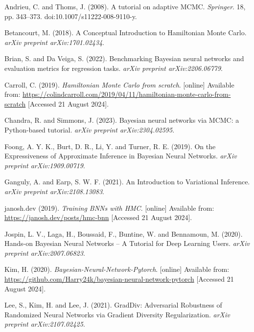 \documentclass[conference]{IEEEtran}
\begin{document}
\begin{thebibliography}{00}

 Andrieu, C. and Thoms, J. (2008). A tutorial on adaptive MCMC. \textit{Springer}. 18, pp. 343–373. doi:10.1007/s11222-008-9110-y.

 Betancourt, M. (2018). A Conceptual Introduction to Hamiltonian Monte Carlo. \textit{arXiv preprint arXiv:1701.02434}.

 Brian, S. and Da Veiga, S. (2022). Benchmarking Bayesian neural networks and evaluation metrics for regression tasks. \textit{arXiv preprint arXiv:2206.06779}.

 Carroll, C. (2019). \textit{Hamiltonian Monte Carlo from scratch}. [online] Available from: \url{https://colindcarroll.com/2019/04/11/hamiltonian-monte-carlo-from-scratch} [Accessed 21 August 2024].

 Chandra, R. and Simmons, J. (2023). Bayesian neural networks via MCMC: a Python-based tutorial. \textit{arXiv preprint arXiv:2304.02595}.

 Foong, A. Y. K., Burt, D. R., Li, Y. and Turner, R. E. (2019). On the Expressiveness of Approximate Inference in Bayesian Neural Networks. \textit{arXiv preprint arXiv:1909.00719}.

 Ganguly, A. and Earp, S. W. F. (2021). An Introduction to Variational Inference. \textit{arXiv preprint arXiv:2108.13083}.

 janosh.dev (2019). \textit{Training BNNs with HMC}. [online] Available from: \url{https://janosh.dev/posts/hmc-bnn} [Accessed 21 August 2024].

 Jospin, L. V., Laga, H., Boussaid, F., Buntine, W. and Bennamoun, M. (2020). Hands-on Bayesian Neural Networks – A Tutorial for Deep Learning Users. \textit{arXiv preprint arXiv:2007.06823}.

 Kim, H. (2020). \textit{Bayesian-Neural-Network-Pytorch}. [online] Available from: \url{https://github.com/Harry24k/bayesian-neural-network-pytorch} [Accessed 21 August 2024].

 Lee, S., Kim, H. and Lee, J. (2021). GradDiv: Adversarial Robustness of Randomized Neural Networks via Gradient Diversity Regularization. \textit{arXiv preprint arXiv:2107.02425}.


\end{thebibliography}
\end{document}
